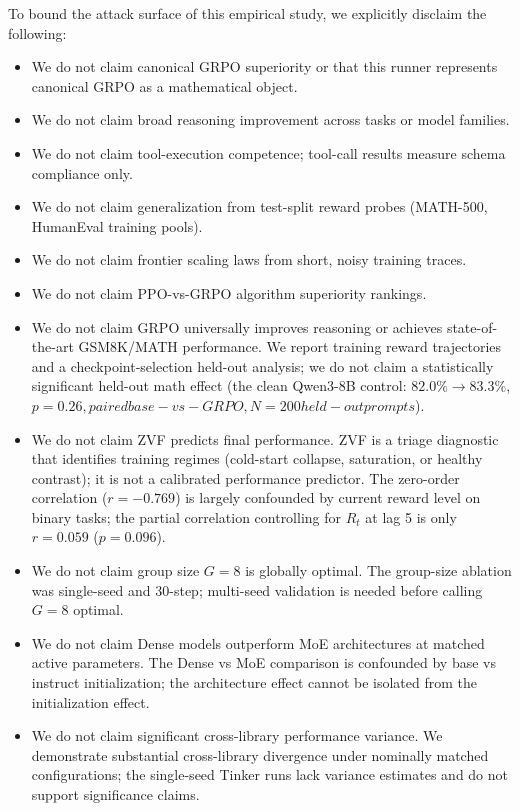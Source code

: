 To bound the attack surface of this empirical study, we explicitly disclaim the following:

\begin{itemize}
    \item We do not claim canonical GRPO superiority or that this runner represents canonical GRPO as a mathematical object.
    \item We do not claim broad reasoning improvement across tasks or model families.
    \item We do not claim tool-execution competence; tool-call results measure schema compliance only.
    \item We do not claim generalization from test-split reward probes (MATH-500, HumanEval training pools).
    \item We do not claim frontier scaling laws from short, noisy training traces.
    \item We do not claim PPO-vs-GRPO algorithm superiority rankings.
    \item We do not claim GRPO universally improves reasoning or achieves state-of-the-art GSM8K/MATH performance. We report training reward trajectories and a checkpoint-selection held-out analysis; we do not claim a statistically significant held-out math effect (the clean Qwen3-8B control: $82.0\% \to 83.3\%$, $p=0.26, paired base-vs-GRPO, N=200 held-out prompts $).
    \item We do not claim ZVF predicts final performance. ZVF is a triage diagnostic that identifies training regimes (cold-start collapse, saturation, or healthy contrast); it is not a calibrated performance predictor. The zero-order correlation ($r = -0.769$) is largely confounded by current reward level on binary tasks; the partial correlation controlling for $R_t$ at lag 5 is only $r = 0.059$ ($p = 0.096$).
    \item We do not claim group size $G=8$ is globally optimal. The group-size ablation was single-seed and 30-step; multi-seed validation is needed before calling $G=8$ optimal.
    \item We do not claim Dense models outperform MoE architectures at matched active parameters. The Dense vs MoE comparison is confounded by base vs instruct initialization; the architecture effect cannot be isolated from the initialization effect.
    \item We do not claim significant cross-library performance variance. We demonstrate substantial cross-library divergence under nominally matched configurations; the single-seed Tinker runs lack variance estimates and do not support significance claims.

\end{itemize}
